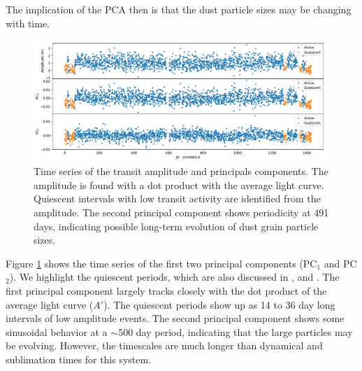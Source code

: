 \documentclass[preprint]{aastex61}
\begin{document}
The implication of the PCA then is that the dust particle sizes may be changing with time.

\begin{figure}[!hbtp]
\begin{centering}
\includegraphics[width=0.99\textwidth]{images/kepler/pc_tser_w_quiescent.pdf}
\caption{Time series of the transit amplitude and principals components.
The amplitude is found with a dot product with the average light curve.
Quiescent intervals with low transit activity are identified from the amplitude.
The second principal component shows periodicity at 491 days, indicating possible long-term evolution of dust grain particle sizes.}\label{fig:tserPC}
\end{centering}
\end{figure}

Figure \ref{fig:tserPC} shows the time series of the first two principal components (PC$_1$ and PC$_2$).
We highlight the quiescent periods, which are also discussed in \citet{kawahara2013starspots}, \citet{vanWerkhoven2014} and \citet{croll2015starspots}.
The first principal component largely tracks closely with the dot product of the average light curve ($A'$).
The quiescent periods show up as 14 to 36 day long intervals of low amplitude events.
The second principal component shows some sinusoidal behavior at a $\sim$500 day period, indicating that the large particles may be evolving.
However, the timescales are much longer than dynamical and sublimation times for this system.



\end{document}
